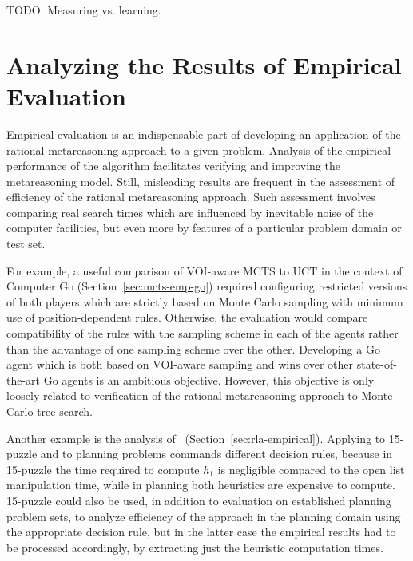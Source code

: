TODO: Measuring vs. learning.

\section{Analyzing the Results of Empirical Evaluation}

Empirical evaluation is an indispensable part of developing an
application of the rational metareasoning approach to a given
problem. Analysis of the empirical performance of the algorithm
facilitates verifying and improving the metareasoning model.  Still,
misleading results are frequent in the assessment of efficiency of the
rational metareasoning approach. Such assessment involves comparing
real search times which are influenced by inevitable noise of the
computer facilities, but even more by features of a particular problem
domain or test set. 

For example, a useful comparison of VOI-aware MCTS
to UCT in the context of Computer Go (Section~\ref{sec:mcts-emp-go})
required configuring restricted versions of both players which are
strictly based on Monte Carlo sampling with minimum use of
position-dependent rules. Otherwise, the evaluation would compare
compatibility of the rules with the sampling scheme in each of the
agents rather than the advantage of one sampling scheme over the
other. Developing a Go agent which is both based on VOI-aware sampling
and wins over other state-of-the-art Go agents is an ambitious
objective. However, this objective is only loosely related to
verification of the rational metareasoning approach to Monte Carlo
tree search. 

Another example is the analysis of
\rationallazyastar~(Section~\ref{sec:rla-empirical}). Applying
\rationallazyastar to 15-puzzle and to planning problems commands
different decision rules, because in 15-puzzle the time required to
compute $h_1$ is negligible compared to the open list manipulation time,
while in planning both heuristics are expensive to compute. 15-puzzle
could also be used, in addition to evaluation on established planning
problem sets, to analyze efficiency of the approach  in the
planning domain using the appropriate decision rule, but in the latter
case the empirical results had to be processed accordingly,
by extracting just the heuristic computation times. 

